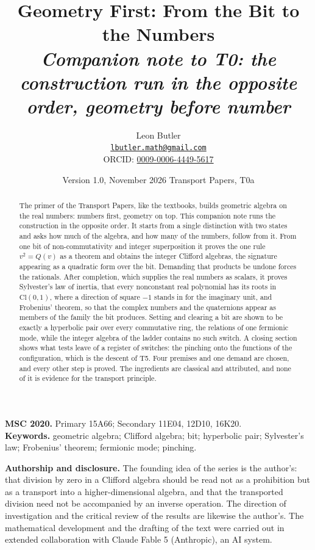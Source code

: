 \documentclass[11pt]{article}
\title{\bfseries Geometry First: From the Bit to the Numbers\\[4pt]
  \large\itshape Companion note to T0: the construction run in the opposite order, geometry before number}
\author{Leon Butler\\ \normalsize\href{mailto:lbutler.math@gmail.com}{\texttt{lbutler.math@gmail.com}}\\ \normalsize ORCID: \href{https://orcid.org/0009-0006-4449-5617}{0009-0006-4449-5617}}
\date{Version 1.0, November 2026 \textperiodcentered{} Transport Papers, T0a}
\theoremstyle{plain}
\theoremstyle{definition}
\theoremstyle{plain}
\theoremstyle{definition}
\newcommand{\Cl}{\mathrm{Cl}}
\begin{document}
\maketitle

\begin{abstract}
\normalsize
The primer of the Transport Papers, like the textbooks, builds geometric algebra on the real numbers: numbers first, geometry on top. This companion note runs the construction in the opposite order. It starts from a single distinction with two states and asks how much of the algebra, and how many of the numbers, follow from it. From one bit of non-commutativity and integer superposition it proves the one rule $v^{2} = Q(v)$ as a theorem and obtains the integer Clifford algebras, the signature appearing as a quadratic form over the bit. Demanding that products be undone forces the rationals. After completion, which supplies the real numbers as scalars, it proves Sylvester's law of inertia, that every nonconstant real polynomial has its roots in $\Cl(0,1)$, where a direction of square $-1$ stands in for the imaginary unit, and Frobenius' theorem, so that the complex numbers and the quaternions appear as members of the family the bit produces. Setting and clearing a bit are shown to be exactly a hyperbolic pair over every commutative ring, the relations of one fermionic mode, while the integer algebra of the ladder contains no such switch. A closing section shows what tests leave of a register of switches: the pinching onto the functions of the configuration, which is the descent of T5. Four premises and one demand are chosen, and every other step is proved. The ingredients are classical and attributed, and none of it is evidence for the transport principle.
\end{abstract}

\medskip
\noindent\textbf{MSC 2020.} Primary 15A66; Secondary 11E04, 12D10, 16K20.\\
\textbf{Keywords.} geometric algebra; Clifford algebra; bit; hyperbolic pair; Sylvester's law; Frobenius' theorem; fermionic mode; pinching.

\newpage
\textbf{Authorship and disclosure. }The founding idea of the series is the author's: that division by zero in a Clifford algebra should be read not as a prohibition but as a transport into a higher-dimensional algebra, and that the transported division need not be accompanied by an inverse operation. The direction of investigation and the critical review of the results are likewise the author's. The mathematical development and the drafting of the text were carried out in extended collaboration with Claude Fable 5 (Anthropic), an AI system.
\end{document}
